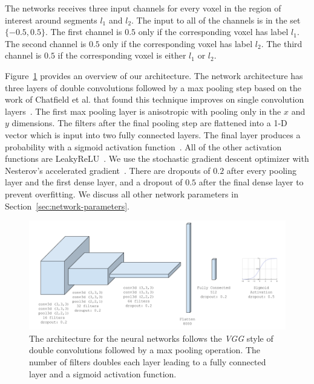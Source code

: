 The networks receives three input channels for every voxel in the region of interest around segments $l_1$ and $l_2$. 
The input to all of the channels is in the set $\{-0.5, 0.5\}$. 
The first channel is $0.5$ only if the corresponding voxel has label $l_1$. 
The second channel is $0.5$ only if the corresponding voxel has label $l_2$. 
The third channel is $0.5$ if the corresponding voxel is either $l_1$ or $l_2$. 

Figure~\ref{fig:architecture} provides an overview of our architecture. 
The network architecture has three layers of double convolutions followed by a max pooling step based on the work of Chatfield et al. that found this technique improves on single convolution layers~\cite{chatfield2014return}. 
The first max pooling layer is anisotropic with pooling only in the $x$ and $y$ dimensions.
The filters after the final pooling step are flattened into a 1-D vector which is input into two fully connected layers.
The final layer produces a probability with a sigmoid activation function~\cite{funahashi1989approximate}. 
All of the other activation functions are LeakyReLU~\cite{maas2013rectifier}. 
We use the stochastic gradient descent optimizer with Nesterov's accelerated gradient~\cite{nesterov1983method}. 
There are dropouts of $0.2$ after every pooling layer and the first dense layer, and a dropout of $0.5$ after the final dense layer to prevent overfitting. 
We discuss all other network parameters in Section~\ref{sec:network-parameters}.

\begin{figure}[t]
	\centering
	\includegraphics[width=0.95\linewidth]{figures/architecture.png}
	\caption{The architecture for the neural networks follows the \textit{VGG} style of double convolutions followed by a max pooling operation. The number of filters doubles each layer leading to a fully connected layer and a sigmoid activation function.}
	\label{fig:architecture}
\end{figure}

